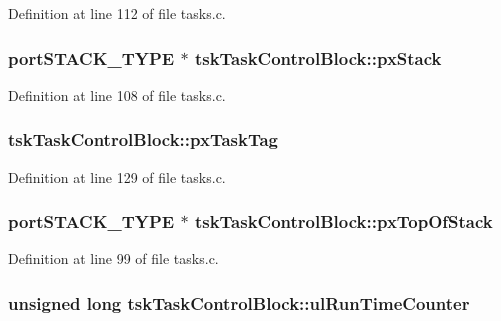 Definition at line 112 of file tasks.\-c.

\hypertarget{structtsk_task_control_block_a072d4f408be6a2364c56010e47dc7096}{
\subsubsection[{px\-Stack}]{\setlength{\rightskip}{0pt plus 5cm}port\-S\-T\-A\-C\-K\-\_\-\-T\-Y\-P\-E $\ast$ tsk\-Task\-Control\-Block\-::px\-Stack}}\label{structtsk_task_control_block_a072d4f408be6a2364c56010e47dc7096}


Definition at line 108 of file tasks.\-c.

\hypertarget{structtsk_task_control_block_ac020a5f4b13cbebfd6f4b21f3326ba78}{
\subsubsection[{px\-Task\-Tag}]{ tsk\-Task\-Control\-Block\-::px\-Task\-Tag}}\label{structtsk_task_control_block_ac020a5f4b13cbebfd6f4b21f3326ba78}


Definition at line 129 of file tasks.\-c.

\hypertarget{structtsk_task_control_block_a4ebd83cb3a10ec0f6113f9c3c13aeacc}{
\subsubsection[{px\-Top\-Of\-Stack}]{ port\-S\-T\-A\-C\-K\-\_\-\-T\-Y\-P\-E $\ast$ tsk\-Task\-Control\-Block\-::px\-Top\-Of\-Stack}}\label{structtsk_task_control_block_a4ebd83cb3a10ec0f6113f9c3c13aeacc}


Definition at line 99 of file tasks.\-c.

\hypertarget{structtsk_task_control_block_a79f0077123918f7ee91496ff2b5f1ab4}{
\subsubsection[{ul\-Run\-Time\-Counter}]{\setlength{\rightskip}{0pt plus 5cm}unsigned long tsk\-Task\-Control\-Block\-::ul\-Run\-Time\-Counter}}\label{structtsk_task_control_block_a79f0077123918f7ee91496ff2b5f1ab4}


